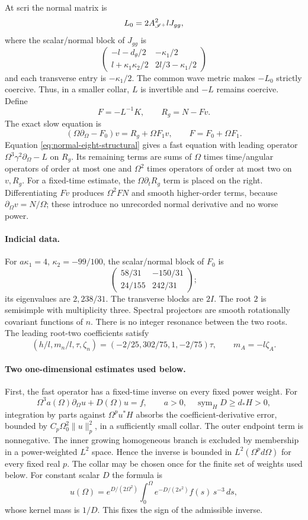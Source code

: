 At scri the normal matrix is
\[
 L_0=2A_{\mathscr I^+}^2lJ_{gg},
\]
where the scalar/normal block of $J_{gg}$ is
\[
 \begin{pmatrix}
 -l-d_\theta/2&-\kappa_1/2\\
 l+\kappa_1\kappa_2/2&2l/3-\kappa_1/2
 \end{pmatrix}
\]
and each transverse entry is $-\kappa_1/2$. The common wave metric makes
$-L_0$ strictly coercive. Thus, in a smaller collar, $L$ is invertible and
$-L$ remains coercive. Define
\[
 F=-L^{-1}K,
 \qquad R_g=N-Fv .
\]
The exact slow equation is
\begin{equation}
 (\Omega\partial_\Omega-F_0)v=R_g+\Omega F_1v,
 \qquad F=F_0+\Omega F_1 .
 \label{eq:normal-slow}
\end{equation}
Equation \eqref{eq:normal-eight-structural} gives a fast equation with leading
operator $\Omega^3\gamma^2\partial_\Omega-L$ on $R_g$. Its remaining terms
are sums of $\Omega$ times time/angular operators of order at most one and
$\Omega^2$ times operators of order at most two on $v,R_g$.
For a fixed-time estimate, the $\Omega\partial_tR_g$ term is placed on the
right. Differentiating $Fv$ produces $\Omega^2FN$ and smooth higher-order
terms, because $\partial_\Omega v=N/\Omega$; these introduce no unrecorded
normal derivative and no worse power.

\paragraph{Indicial data.}
For $a\kappa_1=4$, $\kappa_2=-99/100$, the scalar/normal block of $F_0$ is
\[
 \begin{pmatrix}58/31&-150/31\\24/155&242/31\end{pmatrix};
\]
its eigenvalues are $2,238/31$. The transverse blocks are $2I$.
The root $2$ is semisimple with multiplicity three. Spectral projectors are
smooth rotationally covariant functions of $n$. There is no integer
resonance between the two roots. The leading root-two coefficients satisfy
\[
 (h/l,m_n/l,\tau,\zeta_n)
   =(-2/25,302/75,1,-2/75)\tau,
 \qquad m_A=-l\zeta_A.
\]

\paragraph{Two one-dimensional estimates used below.}
First, the fast operator has a fixed-time inverse on every fixed power
weight. For
\[
 \Omega^3a(\Omega)\partial_\Omega u+D(\Omega)u=f,
 \qquad a>0,\quad\operatorname{sym}_HD\ge d_*H>0,
\]
integration by parts against $\Omega^p u^*H$ absorbs the coefficient-derivative
error, bounded by $C_p\Omega_0^2\|u\|_p^2$, in a sufficiently small collar.
The outer endpoint term is nonnegative. The inner growing homogeneous branch
is excluded by membership in a power-weighted $L^2$ space. Hence the inverse
is bounded in $L^2(\Omega^p d\Omega)$ for every fixed real $p$. The collar
may be chosen once for the finite set of weights used below. For constant
scalar $D$ the formula is
\[
 u(\Omega)=e^{D/(2\Omega^2)}
 \int_0^\Omega e^{-D/(2s^2)}f(s)\,s^{-3}\,ds,
\]
whose kernel mass is $1/D$. This fixes the sign of the admissible inverse.

